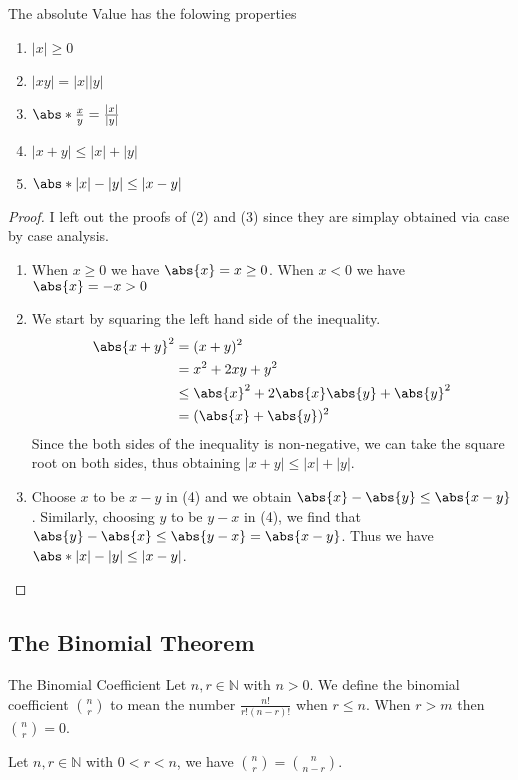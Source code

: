 \documentclass[a4paper]{article}
\begin{document}
\begin{prp}{}{} The absolute Value has the folowing properties
\begin{enumerate}
\item $|x|\geq0$
\item $|xy|=|x||y|$
\item $\abs*{\frac{x}{y}}=\frac{|x|}{|y|}$
\item $|x+y|\leq|x|+|y|$
\item $\abs*{|x|-|y|}\leq|x-y|$
\end{enumerate}
\end{prp}
\begin{proof}  I left out the proofs of (2) and (3) since they are simplay obtained via case by case analysis. 
\begin{enumerate}
\item When $x\geq0$ we have $\abs{x}=x\geq0$. When $x<0$ we have $\abs{x}=-x>0$
\item We start by squaring the left hand side of the inequality. 
\begin{align*}
\abs{x+y}^2&=(x+y)^2 \\
&=x^2+2xy+y^2 \\
&\leq \abs{x}^2+2\abs{x}\abs{y}+\abs{y}^2 \\
&=(\abs{x}+\abs{y})^2
\end{align*}
Since the both sides of the inequality is non-negative, we can take the square root on both sides, thus obtaining $|x+y|\leq|x|+|y|$. 
\item Choose $x$ to be $x-y$ in (4) and we obtain $\abs{x}-\abs{y}\leq\abs{x-y}$. Similarly, choosing $y$ to be $y-x$ in (4), we find that $\abs{y}-\abs{x}\leq\abs{y-x}=\abs{x-y}$. Thus we have $\abs*{|x|-|y|}\leq|x-y|$. 
\end{enumerate}
\end{proof}

\subsection{The Binomial Theorem}
\begin{defn}{The Binomial Coefficient}{} Let $n,r\in\mathbb{N}$ with $n>0$. We define the binomial coefficient $\binom{n}{r}$ to mean the number $\frac{n!}{r!(n-r)!}$ when $r\leq n$. When $r>m$ then $\binom{n}{r}=0$. 
\end{defn}

\begin{prp}{}{} Let $n,r\in\mathbb{N}$ with $0<r<n$, we have $\binom{n}{r}=\binom{n}{n-r}$. 
\end{prp}
\end{document}
